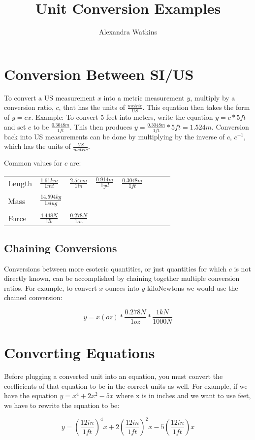 \documentclass[12pt, letterpaper]{article}
\title{Unit Conversion Examples}
\author{Alexandra Watkins}
\begin{document}
\maketitle
\section{Conversion Between SI/US}
To convert a US measurement $x$ into a metric measurement $y$, multiply by a conversion ratio, $c$, that has the units of $\frac{metric}{US}$. This equation then takes the form of $y=cx$. Example: To convert 5 feet into meters, write the equation $y = c * 5 ft$ and set $c$ to be $ \frac{0.3048m}{1ft}$. This then produces $y = \frac{0.3048m}{1ft} * 5ft = 1.524 m$. Conversion back into US measurements can be done by multiplying by the inverse of $c$, $c^{-1}$, which has the units of $\frac{US}{metric}$. 

Common values for $c$ are:
\begin{table}[h!]
    \begin{tabular}{llllllll}
    Length & $\frac{1.61km}{1mi}$     & $\frac{2.54cm}{1in}$ & $\frac{0.914m}{1yd}$ & $\frac{0.3048m}{1ft}$ &  &  &  \\
           &                          &                      &                      &                       &  &  &  \\
    Mass   & $\frac{14.594kg}{1slug}$ &                      &                      &                       &  &  &  \\
           &                          &                      &                      &                       &  &  &  \\
    Force  & $\frac{4.448N}{1lb}$     & $\frac{0.278N}{1oz}$ &                      &                       &  &  & 
    \end{tabular}
\end{table}
\subsection{Chaining Conversions}
Conversions between more esoteric quantities, or just quantities for which $c$ is not directly known, can be accomplished by chaining together multiple conversion ratios. For example, to convert $x$ ounces into $y$ kiloNewtons we would use the chained conversion:

$$ y = x\left(oz\right) * \frac{0.278N}{1oz} * \frac{1kN}{1000N}$$
\section{Converting Equations}
Before plugging a converted unit into an equation, you must convert the coefficients of that equation to be in the correct units as well. For example, if we have the equation $y = x^4 + 2x^2 - 5x$ where x is in inches and we want to use feet, we have to rewrite the equation to be:

$$y = \left(\frac{12in}{1ft}\right)^4x + 2 \left(\frac{12in}{1ft}\right)^2x - 5 \left(\frac{12in}{1ft}\right)x$$
\end{document}

